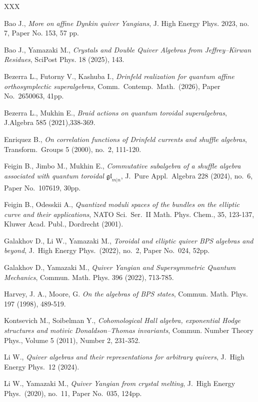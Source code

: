 \documentclass{amsart}
\def\fgl{{\mathfrak{gl}}}
\begin{document}
\begin{thebibliography}{XXX}

Bao J.,
{\em More on affine Dynkin quiver Yangians},
J. High Energy Phys. 2023, no. 7, Paper No. 153, 57 pp.

Bao J., Yamazaki M.,
{\em Crystals and Double Quiver Algebras from Jeffrey–Kirwan Residues},
SciPost Phys. 18 (2025), 143.

Bezerra L., Futorny V., Kashuba I., 
{\em Drinfeld realization for quantum affine orthosymplectic superalgebras},
Comm.\ Contemp.\ Math.\ (2026), Paper No.~2650063, 41pp.

Bezerra L., Mukhin E.,
{\em Braid actions on quantum toroidal superalgebras},
J.Algebra 585 (2021),338-369.

Enriquez B.,
{\em On correlation functions of Drinfeld currents and shuffle algebras}, 
Transform.\ Groups 5 (2000), no.~2, 111-120.

Feigin B., Jimbo M., Mukhin E., 
{\em Commutative subalgebra of a shuffle algebra associated with quantum toroidal $\fgl_{m|n}$},
J.\ Pure Appl.\ Algebra 228 (2024), no.~6, Paper No.~107619, 30pp.

Feigin B., Odesskii A.,
{\em Quantized moduli spaces of the bundles on the elliptic curve and their applications}, 
NATO Sci.\ Ser.\ II Math. Phys. Chem., 35, 123-137, Kluwer Acad. Publ., Dordrecht (2001).	

Galakhov D., Li W., Yamazaki M., 
{\em Toroidal and elliptic quiver BPS algebras and beyond}, 
J.\ High Energy Phys.\ (2022), no.~2, Paper No.~024, 52pp.

Galakhov D., Yamazaki M., 
{\em Quiver Yangian and Supersymmetric Quantum Mechanics}, 
Commun. Math. Phys. 396 (2022), 713-785.

Harvey, J. A., Moore, G. 
{\em On the algebras of BPS states},
Commun. Math. Phys. 197 (1998), 489-519.

Kontsevich M., Soibelman Y., 
{\em Cohomological Hall algebra, exponential Hodge structures and motivic Donaldson–Thomas invariants},
Commun. Number Theory Phys., Volume 5 (2011), Number 2, 231-352.

Li W.,
{\em Quiver algebras and their representations for arbitrary quivers}, 
J.\ High Energy Phys.\ 12 (2024).

Li W., Yamazaki M.,
{\em Quiver Yangian from crystal melting},
J.\ High Energy Phys.\ (2020), no.~11, Paper No.~035, 124pp.


\end{thebibliography}
\end{document}
